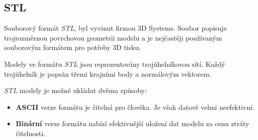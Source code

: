 \subsection{STL}
Souborový formát \textit{\gls{STL}}, byl vyvinut firmou 3D Systems. Soubor popisuje trojrozměrnou povrchovou geometrii modelu a je nejčastěji používaným souborovým formátem pro potřeby 3D tisku. \autocite{3DAddFab}

Modely ve formátu \textit{\gls{STL}} jsou reprezentovány trojúhelníkovou sítí. Každý trojúhelník je popsán třemi krajními body a normálovým vektorem. \autocite{stl:specification}

\textit{\gls{STL}} modely je možné ukládat dvěma způsoby:  
\begin{itemize}
    \item \textbf{ASCII} verze formátu je čitelná pro člověka. Je však datově velmi neefektivní.
    \item \textbf{Binární} verze formátu nabízí efektivnější uložení dat modelu za cenu ztráty čitelnosti.
\end{itemize}